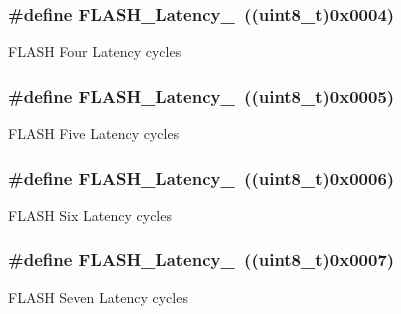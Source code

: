 \subsubsection[{F\+L\+A\+S\+H\+\_\+\+Latency\+\_\+4}]{\setlength{\rightskip}{0pt plus 5cm}\#define F\+L\+A\+S\+H\+\_\+\+Latency\+\_~((uint8\+\_\+t)0x0004)}\label{group___flash___latency_ga74a5deaec2020e484ce576925ff7de16}
F\+L\+A\+S\+H Four Latency cycles \hypertarget{group___flash___latency_ga8e52670ad258b0a95c94b99b8d7eab27}{}
\subsubsection[{F\+L\+A\+S\+H\+\_\+\+Latency\+\_\+5}]{\setlength{\rightskip}{0pt plus 5cm}\#define F\+L\+A\+S\+H\+\_\+\+Latency\+\_~((uint8\+\_\+t)0x0005)}\label{group___flash___latency_ga8e52670ad258b0a95c94b99b8d7eab27}
F\+L\+A\+S\+H Five Latency cycles \hypertarget{group___flash___latency_ga053dfbef3307536ff40a5ceb2576a4a3}{}
\subsubsection[{F\+L\+A\+S\+H\+\_\+\+Latency\+\_\+6}]{\setlength{\rightskip}{0pt plus 5cm}\#define F\+L\+A\+S\+H\+\_\+\+Latency\+\_~((uint8\+\_\+t)0x0006)}\label{group___flash___latency_ga053dfbef3307536ff40a5ceb2576a4a3}
F\+L\+A\+S\+H Six Latency cycles \hypertarget{group___flash___latency_ga352a374f6ae41d2cae767ed95efc6ae5}{}
\subsubsection[{F\+L\+A\+S\+H\+\_\+\+Latency\+\_\+7}]{\setlength{\rightskip}{0pt plus 5cm}\#define F\+L\+A\+S\+H\+\_\+\+Latency\+\_~((uint8\+\_\+t)0x0007)}\label{group___flash___latency_ga352a374f6ae41d2cae767ed95efc6ae5}
F\+L\+A\+S\+H Seven Latency cycles \hypertarget{group___flash___latency_gafcbd098d482318a622a58bf168547389}{}
